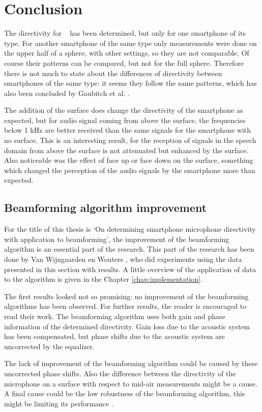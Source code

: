 \clearpage
\section{Conclusion}
The directivity for \nexus~ has been determined, but only for one smartphone of its type.
For another smartphone of the same type only measurements were done on the upper half of a sphere, with other settings, so they are not comparable.
Of course their patterns can be compared, but not for the full sphere.
Therefore there is not much to state about the differences of directivity between smartphones of the same type: it seems they follow the same patterns, which has also been concluded by Gaubitch et al. \cite{Gaubitch2014}.

The addition of the surface does change the directivity of the smartphone as expected, but for audio signal coming from above the surface, the frequencies below 1 kHz are better received than the same signals for the smartphone with no surface.
This is an interesting result, for the reception of signals in the speech domain from above the surface is not attenuated but enhanced by the surface.
Also noticeable was the effect of face up or face down on the surface, something which changed the perception of the audio signals by the smartphone more than expected.

\subsection{Beamforming algorithm improvement}
\label{ssec:beam_impr}
For the title of this thesis is `On determining smartphone microphone directivity with application to beamforming', the improvement of the beamforming algorithm is an essential part of the research.
This part of the research has been done by Van Wijngaarden en Wouters \cite{BAP:ErikNiels}, who did experiments using the data presented in this section with results. 
A little overview of the application of data to the algorithm is given in the Chapter \ref{chap:implementation}.

The first results looked not so promising: no improvement of the beamforming algorithms has been observed.
For further results, the reader is encouraged to read their work.
The beamforming algorithm uses both gain and phase information of the determined directivity.
Gain loss due to the acoustic system has been compensated, but phase shifts due to the acoustic system are uncorrected by the equalizer.

The lack of improvement of the beamforming algorithm could be caused by these uncorrected phase shifts.
Also the difference between the directivity of the microphone on a surface with respect to mid-air measurements might be a cause.
A final cause could be the low robustness of the beamforming algorithm, this might be limiting its performance \cite{BAP:ErikNiels}.

